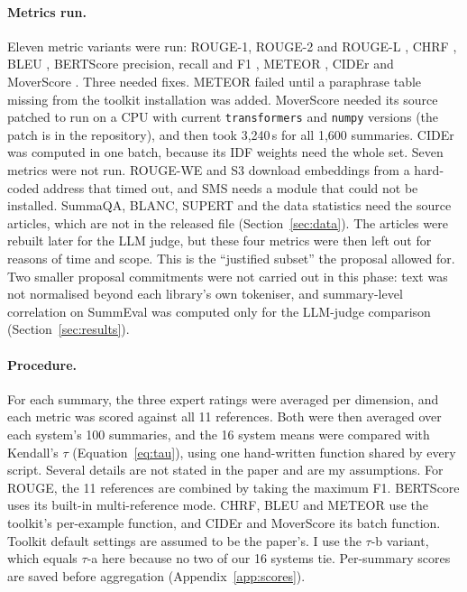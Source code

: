 \documentclass[11pt]{article}
\begin{document}
\paragraph{Metrics run.}
Eleven metric variants were run: ROUGE-1, ROUGE-2 and ROUGE-L \citep{lin-2004-rouge}, CHRF \citep{popovic-2015-chrf}, BLEU \citep{papineni-etal-2002-bleu}, BERTScore precision, recall and F1 \citep{zhang-etal-2020-bertscore}, METEOR \citep{denkowski-lavie-2014-meteor}, CIDEr \citep{vedantam-etal-2015-cider} and MoverScore \citep{zhao-etal-2019-moverscore}. Three needed fixes. METEOR failed until a paraphrase table missing from the toolkit installation was added. MoverScore needed its source patched to run on a CPU with current \texttt{transformers} and \texttt{numpy} versions (the patch is in the repository), and then took 3,240\,s for all 1,600 summaries. CIDEr was computed in one batch, because its IDF weights need the whole set. Seven metrics were not run. ROUGE-WE and S3 download embeddings from a hard-coded address that timed out, and SMS needs a module that could not be installed. SummaQA, BLANC, SUPERT and the data statistics need the source articles, which are not in the released file (Section~\ref{sec:data}). The articles were rebuilt later for the LLM judge, but these four metrics were then left out for reasons of time and scope. This is the ``justified subset'' the proposal allowed for. Two smaller proposal commitments were not carried out in this phase: text was not normalised beyond each library's own tokeniser, and summary-level correlation on SummEval was computed only for the LLM-judge comparison (Section~\ref{sec:results}).

\paragraph{Procedure.}
For each summary, the three expert ratings were averaged per dimension, and each metric was scored against all 11 references. Both were then averaged over each system's 100 summaries, and the 16 system means were compared with Kendall's $\tau$ (Equation~\ref{eq:tau}), using one hand-written function shared by every script. Several details are not stated in the paper and are my assumptions. For ROUGE, the 11 references are combined by taking the maximum F1. BERTScore uses its built-in multi-reference mode. CHRF, BLEU and METEOR use the toolkit's per-example function, and CIDEr and MoverScore its batch function. Toolkit default settings are assumed to be the paper's. I use the $\tau$-b variant, which equals $\tau$-a here because no two of our 16 systems tie. Per-summary scores are saved before aggregation (Appendix~\ref{app:scores}).
\end{document}
